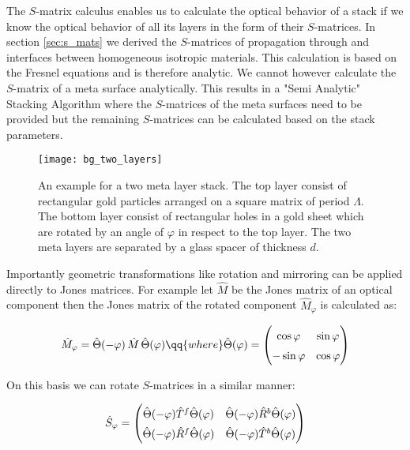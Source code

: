 The $S$-matrix calculus enables us to calculate the optical behavior of a stack if we know the optical behavior of all its layers in the form of their $S$-matrices. In section \ref{sec:s_mats} we derived the $S$-matrices of propagation through and interfaces between homogeneous isotropic materials. This calculation is based on the Fresnel equations and is therefore analytic. We cannot however calculate the $S$-matrix of a meta surface analytically. This results in a "Semi Analytic" Stacking Algorithm where the $S$-matrices of the meta surfaces need to be provided but the remaining $S$-matrices can be calculated based on the stack parameters.

\begin{figure}[H]
    \centering
    \texttt{[image: bg\_two\_layers]}
    \caption{An example for a two meta layer stack. The top layer consist of rectangular gold particles arranged on a square matrix of period $\Lambda$. The bottom layer consist of rectangular holes in a gold sheet which are rotated by an angle of $\varphi$ in respect to the top layer. The two meta layers are separated by a glass spacer of thickness $d$.}
    \label{fig:bg:two_layers}
\end{figure}

Importantly geometric transformations like rotation and mirroring can be applied directly to Jones matrices. For example let $\hat M$ be the Jones matrix of an optical component then the Jones matrix of the rotated component $\hat{M}_{\varphi}$ is calculated as:

\begin{equation}
    \hat{M}_{\varphi} = \hat \Theta(-\varphi) \, \hat{M} \, \hat \Theta(\varphi)
    \qq{where}
    \hat \Theta(\varphi) =
    \begin{pmatrix}
        \cos \varphi & \sin \varphi \\
        -\sin \varphi & \cos \varphi
    \end{pmatrix}
\end{equation}

On this basis we can rotate $S$-matrices in a similar manner:

\begin{equation}
    \hat S_\varphi =
    \begingroup
    \renewcommand*{\arraystretch}{1.5}
        \begin{pmatrix}
            \hat \Theta(-\varphi) \hat T^f \hat \Theta(\varphi)&
            \hat \Theta(-\varphi) \hat R^b \hat \Theta(\varphi)\\
            \hat \Theta(-\varphi) \hat R^f \hat \Theta(\varphi)&
            \hat \Theta(-\varphi) \hat T^b \hat \Theta(\varphi)
        \end{pmatrix}
    \endgroup
\end{equation}

